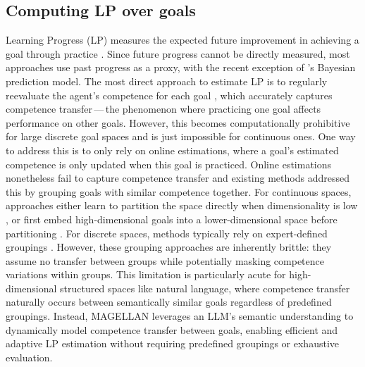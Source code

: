 \documentclass{article}
\begin{document}
\subsection{Computing LP over goals} \label{sec:related_work_lp}
Learning Progress (LP) measures the expected future improvement in achieving a goal through practice \citep{oudeyer_intrinsic_2007}. Since future progress cannot be directly measured, most approaches use past progress as a proxy, with the recent exception of \cite{kumar_practice_2024}'s Bayesian prediction model. The most direct approach to estimate LP is to regularly reevaluate the agent's competence for each goal \citep{kanitscheider_multi-task_2021,zhang_omni_2024}, which accurately captures competence transfer\,---\,the phenomenon where practicing one goal affects performance on other goals. However, this becomes computationally prohibitive for large discrete goal spaces and is just impossible for continuous ones. 
One way to address this is to only rely on online estimations, where a goal's estimated competence is only updated when this goal is practiced. Online estimations nonetheless fail to capture competence transfer and existing methods addressed this by grouping goals with similar competence together. For continuous spaces, approaches either learn to partition the space directly when dimensionality is low \citep{oudeyer_intrinsic_2007,baranes_active_2013,portelas_teacher_2019}, or first embed high-dimensional goals into a lower-dimensional space before partitioning \citep{laversanne-finot_curiosity_2018,kovac_grimgep_2023}. For discrete spaces, methods typically rely on expert-defined groupings \citep{stout_competence_2010,matiisen_teacher-student_2017}. However, these grouping approaches are inherently brittle: they assume no transfer between groups while potentially masking competence variations within groups. This limitation is particularly acute for high-dimensional structured spaces like natural language, where competence transfer naturally occurs between semantically similar goals regardless of predefined groupings. Instead, MAGELLAN leverages an LLM's semantic understanding to dynamically model competence transfer between goals, enabling efficient and adaptive LP estimation without requiring predefined groupings or exhaustive evaluation.
\end{document}
